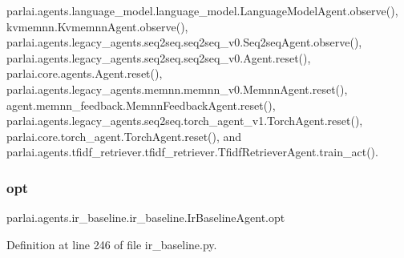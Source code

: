 parlai.\+agents.\+language\+\_\+model.\+language\+\_\+model.\+Language\+Model\+Agent.\+observe(), kvmemnn.\+Kvmemnn\+Agent.\+observe(), parlai.\+agents.\+legacy\+\_\+agents.\+seq2seq.\+seq2seq\+\_\+v0.\+Seq2seq\+Agent.\+observe(), parlai.\+agents.\+legacy\+\_\+agents.\+seq2seq.\+seq2seq\+\_\+v0.\+Agent.\+reset(), parlai.\+core.\+agents.\+Agent.\+reset(), parlai.\+agents.\+legacy\+\_\+agents.\+memnn.\+memnn\+\_\+v0.\+Memnn\+Agent.\+reset(), agent.\+memnn\+\_\+feedback.\+Memnn\+Feedback\+Agent.\+reset(), parlai.\+agents.\+legacy\+\_\+agents.\+seq2seq.\+torch\+\_\+agent\+\_\+v1.\+Torch\+Agent.\+reset(), parlai.\+core.\+torch\+\_\+agent.\+Torch\+Agent.\+reset(), and parlai.\+agents.\+tfidf\+\_\+retriever.\+tfidf\+\_\+retriever.\+Tfidf\+Retriever\+Agent.\+train\+\_\+act().

\mbox{\label{classparlai_1_1agents_1_1ir__baseline_1_1ir__baseline_1_1IrBaselineAgent_a2c83d3c7e15884871dbfabea9f110933}} 
\subsubsection{\texorpdfstring{opt}{opt}}
{\footnotesize\ttfamily parlai.\+agents.\+ir\+\_\+baseline.\+ir\+\_\+baseline.\+Ir\+Baseline\+Agent.\+opt}



Definition at line 246 of file ir\+\_\+baseline.\+py.



